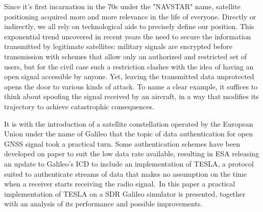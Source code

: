 
Since it's first incarnation in the 70s under the "NAVSTAR" name, satellite
positioning acquired more and more relevance in the life of everyone. Directly
or indirectly, we all rely on technological aids to precisely define our
position. This exponential trend uncovered in recent years the need to secure
the information transmitted by legitimate satellites: military signals are
encrypted before transmission with schemes that allow only an authorized and
restricted set of users, but for the civil case such a restriction clashes with
the idea of having an open signal accessible by anyone. Yet, leaving the
transmitted data unprotected opens the door to various kinds of attack. To name
a clear example, it suffices to think about spoofing the signal received by an
aircraft, in a way that modifies its trajectory to achieve catastrophic
consequences.

It is with the introduction of a satellite constellation operated by the
European Union under the name of Galileo that the topic of data authentication
for open GNSS signal took a practical turn. Some authentication schemes have
been developed on paper to suit the low data rate available, resulting in ESA
releasing an update to Galileo's ICD to include an implementation of TESLA, a
protocol suited to authenticate streams of data that makes no assumption on the
time when a receiver starts receiving the radio signal.\
In this paper a practical implementation of TESLA on a SDR Galileo
simulator is presented, together with an analysis of its performance and
possible improvements.
